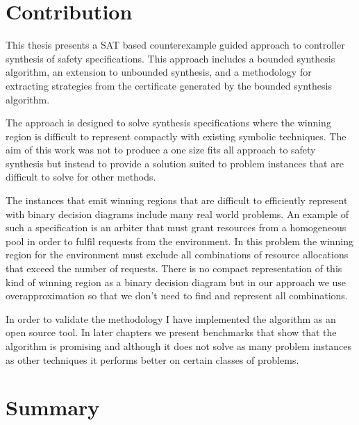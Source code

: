 \section{Contribution}

This thesis presents a SAT based counterexample guided approach to controller synthesis of safety specifications. This approach includes a bounded synthesis algorithm, an extension to unbounded synthesis, and a methodology for extracting strategies from the certificate generated by the bounded synthesis algorithm. 

The approach is designed to solve synthesis specifications where the winning region is difficult to represent compactly with existing symbolic techniques. The aim of this work was not to produce a one size fits all approach to safety synthesis but instead to provide a solution suited to problem instances that are difficult to solve for other methods.

The instances that emit winning regions that are difficult to efficiently represent with binary decision diagrams include many real world problems. An example of such a specification is an arbiter that must grant resources from a homogeneous pool in order to fulfil requests from the environment. In this problem the winning region for the environment must exclude all combinations of resource allocations that exceed the number of requests. There is no compact representation of this kind of winning region as a binary decision diagram but in our approach we use overapproximation so that we don't need to find and represent all combinations.

In order to validate the methodology I have implemented the algorithm as an open source tool. In later chapters we present benchmarks that show that the algorithm is promising and although it does not solve as many problem instances as other techniques it performs better on certain classes of problems.


\section{Summary}

